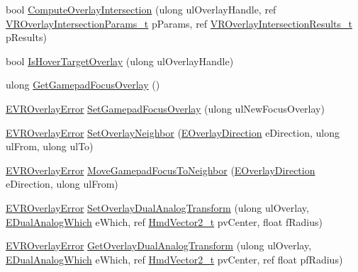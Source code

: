 \begin{DoxyCompactItemize}
\item 
bool \mbox{\hyperlink{class_valve_1_1_v_r_1_1_c_v_r_overlay_a1ce5f32391e533cd95c573152a2b0d1e}{Compute\+Overlay\+Intersection}} (ulong ul\+Overlay\+Handle, ref \mbox{\hyperlink{struct_valve_1_1_v_r_1_1_v_r_overlay_intersection_params__t}{V\+R\+Overlay\+Intersection\+Params\+\_\+t}} p\+Params, ref \mbox{\hyperlink{struct_valve_1_1_v_r_1_1_v_r_overlay_intersection_results__t}{V\+R\+Overlay\+Intersection\+Results\+\_\+t}} p\+Results)
\item 
bool \mbox{\hyperlink{class_valve_1_1_v_r_1_1_c_v_r_overlay_ac91d70f1ab82315f0211bd3511e39965}{Is\+Hover\+Target\+Overlay}} (ulong ul\+Overlay\+Handle)
\item 
ulong \mbox{\hyperlink{class_valve_1_1_v_r_1_1_c_v_r_overlay_ae6ebda8ff88a57e655434e25e6e35e35}{Get\+Gamepad\+Focus\+Overlay}} ()
\item 
\mbox{\hyperlink{namespace_valve_1_1_v_r_aaee5c5144f42b7969d45b854f51b0c18}{E\+V\+R\+Overlay\+Error}} \mbox{\hyperlink{class_valve_1_1_v_r_1_1_c_v_r_overlay_aec3ec57c3684d36a2b446efab4f0811b}{Set\+Gamepad\+Focus\+Overlay}} (ulong ul\+New\+Focus\+Overlay)
\item 
\mbox{\hyperlink{namespace_valve_1_1_v_r_aaee5c5144f42b7969d45b854f51b0c18}{E\+V\+R\+Overlay\+Error}} \mbox{\hyperlink{class_valve_1_1_v_r_1_1_c_v_r_overlay_a3f67978e98a9ed092e42e0354f5031d9}{Set\+Overlay\+Neighbor}} (\mbox{\hyperlink{namespace_valve_1_1_v_r_ad0398c1325c370eb3a4796d89610b868}{E\+Overlay\+Direction}} e\+Direction, ulong ul\+From, ulong ul\+To)
\item 
\mbox{\hyperlink{namespace_valve_1_1_v_r_aaee5c5144f42b7969d45b854f51b0c18}{E\+V\+R\+Overlay\+Error}} \mbox{\hyperlink{class_valve_1_1_v_r_1_1_c_v_r_overlay_a876caebbef8a3a19a53a06fe3debb9ae}{Move\+Gamepad\+Focus\+To\+Neighbor}} (\mbox{\hyperlink{namespace_valve_1_1_v_r_ad0398c1325c370eb3a4796d89610b868}{E\+Overlay\+Direction}} e\+Direction, ulong ul\+From)
\item 
\mbox{\hyperlink{namespace_valve_1_1_v_r_aaee5c5144f42b7969d45b854f51b0c18}{E\+V\+R\+Overlay\+Error}} \mbox{\hyperlink{class_valve_1_1_v_r_1_1_c_v_r_overlay_a3aa8a237a6a51682f894fb7d79f4949f}{Set\+Overlay\+Dual\+Analog\+Transform}} (ulong ul\+Overlay, \mbox{\hyperlink{namespace_valve_1_1_v_r_a3a5fe210bea8b993a1ad42f680119e90}{E\+Dual\+Analog\+Which}} e\+Which, ref \mbox{\hyperlink{struct_valve_1_1_v_r_1_1_hmd_vector2__t}{Hmd\+Vector2\+\_\+t}} pv\+Center, float f\+Radius)
\item 
\mbox{\hyperlink{namespace_valve_1_1_v_r_aaee5c5144f42b7969d45b854f51b0c18}{E\+V\+R\+Overlay\+Error}} \mbox{\hyperlink{class_valve_1_1_v_r_1_1_c_v_r_overlay_ad92db61b0745972e2da6fa0ba2595a33}{Get\+Overlay\+Dual\+Analog\+Transform}} (ulong ul\+Overlay, \mbox{\hyperlink{namespace_valve_1_1_v_r_a3a5fe210bea8b993a1ad42f680119e90}{E\+Dual\+Analog\+Which}} e\+Which, ref \mbox{\hyperlink{struct_valve_1_1_v_r_1_1_hmd_vector2__t}{Hmd\+Vector2\+\_\+t}} pv\+Center, ref float pf\+Radius)

\end{DoxyCompactItemize}
